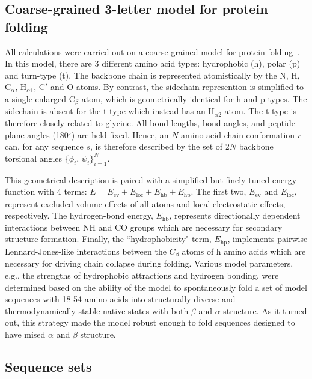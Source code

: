 \documentclass[%
 aip,
rsi,%
 amsmath,amssymb,
 reprint,%
]{revtex4-1}
\newcommand	 {\sbar}	{{s}}
\newcommand	 {\rbar}	{{r}}
\begin{document}
\subsection{Coarse-grained 3-letter model for protein folding}
\noindent
All calculations were carried out on a coarse-grained model for protein folding~. In this model, there are 3 different amino acid types: hydrophobic (h), polar (p) and turn-type (t). The backbone chain is represented atomistically by the N, H, $\mathrm{C}_\alpha$, $\mathrm{H}_{\alpha 1}$, C$'$ and O atoms. By contrast, the sidechain represention is simplified to a single enlarged $\mathrm{C}_\beta$ atom, which is geometrically identical for h and p types. The sidechain is absent for the t type which instead has an $\mathrm{H}_{\alpha 2}$ atom. The t type is therefore closely related to glycine. All bond lengths, bond angles, and peptide plane angles (180$^\circ$) are held fixed. Hence, an $N$-amino acid chain conformation $\rbar$ can, for any sequence $\sbar$, is therefore described by the set of 2$N$ backbone torsional angles $\{\phi_i$, $\psi_i\}_{i=1}^{N}$. 
 
This geometrical description is paired with a simplified but finely tuned energy function with 4 terms: $E= E_\mathrm{ev} + E_\mathrm{loc} + E_\mathrm{hb} + E_\mathrm{hp}$. The first two, $E_\mathrm{ev}$ and $E_\mathrm{loc}$, represent excluded-volume effects of all atoms and local electrostatic effects, respectively. The hydrogen-bond energy, $E_\mathrm{hb}$, represents directionally dependent interactions between NH and CO groups which are necessary for secondary structure formation. Finally, the ``hydrophobicity" term, $E_\mathrm{hp}$, implements pairwise Lennard-Jones-like interactions between the $C_\beta$ atoms of h amino acids which are necessary for driving chain collapse during folding. Various model parameters, e.g., the strengths of hydrophobic attractions and hydrogen bonding, were determined based on the ability of the model to spontaneously fold a set of model sequences with 18-54 amino acids into  structurally diverse and thermodynamically stable native states with both $\beta$ and $\alpha$-structure. As it turned out, this strategy made the model robust enough to fold sequences designed to have mised $\alpha$ and $\beta$ structure. 
 
\subsection{Sequence sets}
\noindent
\end{document}
